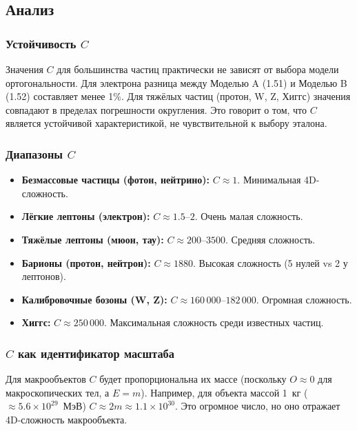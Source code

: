 \documentclass[12pt,a4paper]{article}
\begin{document}
\subsection{Анализ}

\subsubsection{Устойчивость $C$}

Значения $C$ для большинства частиц практически не зависят от выбора модели ортогональности. Для электрона разница между Моделью A (1.51) и Моделью B (1.52) составляет менее 1\%. Для тяжёлых частиц (протон, W, Z, Хиггс) значения совпадают в пределах погрешности округления. Это говорит о том, что $C$ является устойчивой характеристикой, не чувствительной к выбору эталона.

\subsubsection{Диапазоны $C$}

\begin{itemize}
    \item \textbf{Безмассовые частицы (фотон, нейтрино):} $C \approx 1$. Минимальная 4D-сложность.
    \item \textbf{Лёгкие лептоны (электрон):} $C \approx 1.5$--$2$. Очень малая сложность.
    \item \textbf{Тяжёлые лептоны (мюон, тау):} $C \approx 200$--$3500$. Средняя сложность.
    \item \textbf{Барионы (протон, нейтрон):} $C \approx 1880$. Высокая сложность (5 нулей vs 2 у лептонов).
    \item \textbf{Калибровочные бозоны (W, Z):} $C \approx 160\,000$--$182\,000$. Огромная сложность.
    \item \textbf{Хиггс:} $C \approx 250\,000$. Максимальная сложность среди известных частиц.
\end{itemize}

\subsubsection{$C$ как идентификатор масштаба}

Для макрообъектов $C$ будет пропорциональна их массе (поскольку $O \approx 0$ для макроскопических тел, а $E = m$). Например, для объекта массой 1~кг ($\approx 5.6 \times 10^{29}$~МэВ) $C \approx 2m \approx 1.1 \times 10^{30}$. Это огромное число, но оно отражает 4D-сложность макрообъекта.
\end{document}
